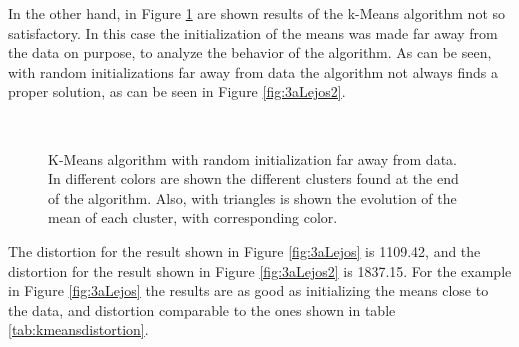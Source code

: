 \documentclass[12pt]{article}
\begin{document}
In the other hand, in Figure \ref{fig:3aLejos_km} are shown results of the k-Means algorithm not so satisfactory. In this case the initialization of the means was made far away from the data on purpose, to analyze the behavior of the algorithm. As can be seen, with random initializations far away from data the algorithm not always finds a proper solution, as can be seen in Figure \ref{fig:3aLejos2}.
\begin{figure} [h!]
\centering
   \\
  \caption{K-Means algorithm with random initialization far away from data. In different colors are shown the different clusters found at the end of the algorithm. Also, with triangles is shown the evolution of the mean of each cluster, with corresponding color.} 
  \label{fig:3aLejos_km}
\end{figure}

The distortion for the result shown in Figure \ref{fig:3aLejos} is 1109.42, and the distortion for the result shown in Figure \ref{fig:3aLejos2} is 1837.15. For the example in Figure \ref{fig:3aLejos} the results are as good as initializing the means close to the data, and distortion comparable to the ones shown in table \ref{tab:kmeansdistortion}.
\end{document}
